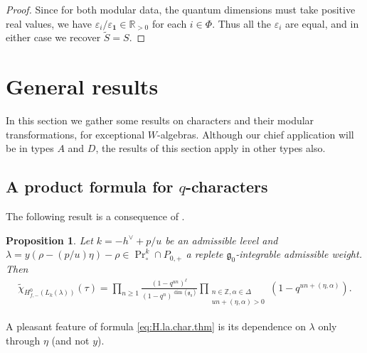 \documentclass[12pt]{amsart}
\theoremstyle{plain}
\newtheorem{prop}[thm]{Proposition}
\theoremstyle{definition}
\numberwithin{equation}{section}
\newcommand{\al}{\alpha}
\newcommand{\la}{\lambda}
\newcommand{\D}{\Delta}
\newcommand{\R}{\mathbb{R}}
\newcommand{\Z}{\mathbb{Z}}
\newcommand{\g}{\mathfrak{g}}
\newcommand{\vac}{\mathbf{1}}
\DeclareMathOperator{\prin}{Pr}
\begin{document}
\begin{proof}
Since for both modular data, the quantum dimensions must take positive real values, we have $\varepsilon_i / \varepsilon_\vac \in \R_{>0}$ for each $i \in \Phi$. Thus all the $\varepsilon_i$ are equal, and in either case we recover $\widetilde{S} = S$.
\end{proof}

\section{General results}

In this section we gather some results on characters and their modular transformations, for exceptional $W$-algebras. Although our chief application will be in types $A$ and $D$, the results of this section apply in other types also.

\subsection{A product formula for $q$-characters}


The following result is a consequence of {\cite[Formula (11)]{KW.boundary}}.
\begin{prop}\label{prop:H.la.char.thm}
Let $k = -h^\vee + p/u$ be an admissible level and $\la = y(\rho - (p/u)\eta)-\rho \in \prin_\circ^k \cap P_{0, +}$ a replete $\g_0$-integrable admissible weight. Then
\begin{align}\label{eq:H.la.char.thm}
\widetilde{\chi}_{H^0_{f, -}(L_k(\la))}(\tau) = \prod_{n \geq 1} \frac{(1-q^{un})^\ell}{(1-q^n)^{\dim(\g_0)}} \prod_{\substack{n \in \Z, \al \in \D \\ un + (\eta, \al) > 0}} (1-q^{un + (\eta, \al)}).
\end{align}
\end{prop}

A pleasant feature of formula \eqref{eq:H.la.char.thm} is its dependence on $\la$ only through $\eta$ (and not $y$).
\end{document}
